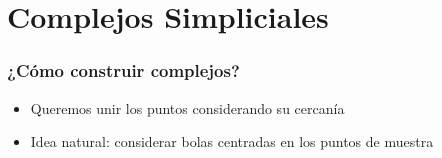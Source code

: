 \documentclass{beamer}
\begin{document}
%
%

\section{Complejos Simpliciales}

\begin{frame}\frametitle{¿Cómo construir complejos?}
  \begin{itemize}[itemsep=2em]
    \item<1-> Queremos unir los puntos considerando su cercanía
    \item<2-> Idea natural: considerar bolas centradas en los puntos de muestra
  \end{itemize}
\end{frame}
\end{document}
